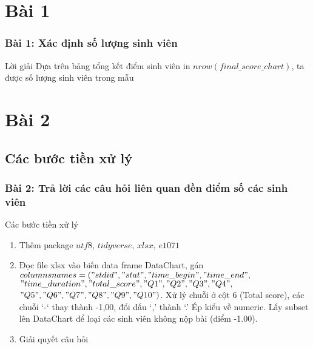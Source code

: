 \documentclass[english,10pt,table]{beamer}
\begin{document}
\frame{
  \maketitle
}


\frame{ \tableofcontents}

\section{Bài 1}
\frame
{
  \frametitle{Bài 1: Xác định số lượng sinh viên}	
\begin{block}{Lời giải}
    Dựa trên bảng tổng kết điểm sinh viên in $nrow(final\_score\_chart )$, ta được số lượng sinh viên trong mẫu
\end{block}
}

\section{Bài 2}
\subsection{Các bước tiền xử lý}
\frame
{
  \frametitle{Bài 2: Trả lời các câu hỏi liên quan đền điểm số các sinh viên}	
\begin{block}{Các bước tiền xử lý}
\begin{enumerate}
	\item Thêm package $utf8$, $tidyverse$, $xlsx$, $e1071$
	\item  Đọc file xlsx vào biến data frame DataChart, gán \\ $columns names = ("stdid", "stat", "time\_begin", "time\_end",$ \\ $"time\_duration", "total\_score", "Q1", "Q2", "Q3", "Q4",$ \\ $"Q5", "Q6", "Q7", "Q8", "Q9", "Q10")$. Xử lý chuỗi ở cột 6 (Total score), các chuỗi ‘-‘ thay thành -1,00, đổi dấu ‘,’ thành ‘.’  Ép kiểu về  numeric. Lấy subset lên DataChart để loại các sinh viên không nộp bài (điểm -1.00).
	\item Giải quyết câu hỏi
\end{enumerate}
\end{block}
}
\end{document}
